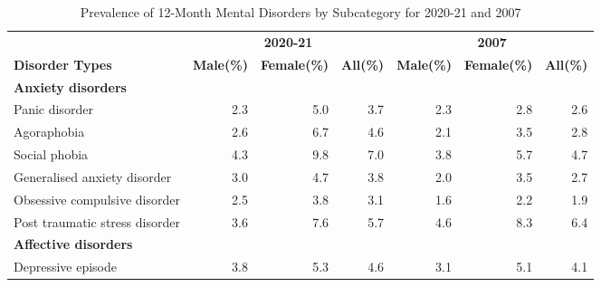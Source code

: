 \documentclass[
  a4paper,
  DIV=11,
  numbers=noendperiod]{scrreport}
\begin{document}
\hypertarget{tbl-sub}{}
\begin{table}
\caption{\label{tbl-sub}Prevalence of 12-Month Mental Disorders by Subcategory for 2020-21 and
2007 }\tabularnewline

\centering
\begin{tabular}[t]{l|>{}r|>{}r|r|>{}r|>{}r|r}
\hline
\multicolumn{1}{c|}{\textbf{ }} & \multicolumn{3}{c|}{\textbf{2020-21}} & \multicolumn{3}{c}{\textbf{2007}} \\
\cline{2-4} \cline{5-7}
\textbf{Disorder Types} & \textbf{Male(\%)} & \textbf{Female(\%)} & \textbf{All(\%)} & \textbf{Male(\%)} & \textbf{Female(\%)} & \textbf{All(\%)}\\
\hline
\multicolumn{7}{l}{\textbf{Anxiety disorders}}\\
\hline
\hspace{1em}Panic disorder & \textcolor[HTML]{2196F3}{2.3} & \textcolor[HTML]{F44336}{5.0} & 3.7 & \textcolor[HTML]{2196F3}{2.3} & \textcolor[HTML]{F44336}{2.8} & 2.6\\
\hline
\hspace{1em}Agoraphobia & \textcolor[HTML]{2196F3}{2.6} & \textcolor[HTML]{F44336}{6.7} & 4.6 & \textcolor[HTML]{2196F3}{2.1} & \textcolor[HTML]{F44336}{3.5} & 2.8\\
\hline
\hspace{1em}Social phobia & \textcolor[HTML]{2196F3}{4.3} & \textcolor[HTML]{F44336}{9.8} & 7.0 & \textcolor[HTML]{2196F3}{3.8} & \textcolor[HTML]{F44336}{5.7} & 4.7\\
\hline
\hspace{1em}Generalised anxiety disorder & \textcolor[HTML]{2196F3}{3.0} & \textcolor[HTML]{F44336}{4.7} & 3.8 & \textcolor[HTML]{2196F3}{2.0} & \textcolor[HTML]{F44336}{3.5} & 2.7\\
\hline
\hspace{1em}Obsessive compulsive disorder & \textcolor[HTML]{2196F3}{2.5} & \textcolor[HTML]{F44336}{3.8} & 3.1 & \textcolor[HTML]{2196F3}{1.6} & \textcolor[HTML]{F44336}{2.2} & 1.9\\
\hline
\hspace{1em}Post traumatic stress disorder & \textcolor[HTML]{2196F3}{3.6} & \textcolor[HTML]{F44336}{7.6} & 5.7 & \textcolor[HTML]{2196F3}{4.6} & \textcolor[HTML]{F44336}{8.3} & 6.4\\
\hline
\multicolumn{7}{l}{\textbf{Affective disorders}}\\
\hline
\hspace{1em}Depressive episode & \textcolor[HTML]{2196F3}{3.8} & \textcolor[HTML]{F44336}{5.3} & 4.6 & \textcolor[HTML]{2196F3}{3.1} & \textcolor[HTML]{F44336}{5.1} & 4.1\\

\end{tabular}
\end{table}
\end{document}
